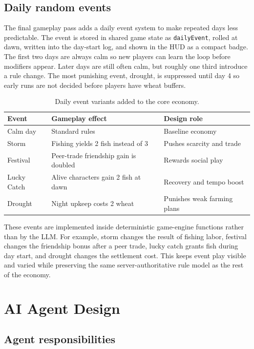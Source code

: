 \documentclass[11pt]{article}
\begin{document}
\subsection{Daily random events}

The final gameplay pass adds a daily event system to make repeated days less
predictable. The event is stored in shared game state as
\texttt{dailyEvent}, rolled at dawn, written into the day-start log, and shown
in the HUD as a compact badge. The first two days are always calm so new players
can learn the loop before modifiers appear. Later days are still often calm, but
roughly one third introduce a rule change. The most punishing event, drought, is
suppressed until day 4 so early runs are not decided before players have wheat
buffers.

\begin{table}[h]
\centering
\begin{tabular}{lll}
\toprule
Event & Gameplay effect & Design role \\
\midrule
Calm day & Standard rules & Baseline economy \\
Storm & Fishing yields 2 fish instead of 3 & Pushes scarcity and trade \\
Festival & Peer-trade friendship gain is doubled & Rewards social play \\
Lucky Catch & Alive characters gain 2 fish at dawn & Recovery and tempo boost \\
Drought & Night upkeep costs 2 wheat & Punishes weak farming plans \\
\bottomrule
\end{tabular}
\caption{Daily event variants added to the core economy.}
\end{table}

These events are implemented inside deterministic game-engine functions rather
than by the LLM. For example, storm changes the result of fishing labor,
festival changes the friendship bonus after a peer trade, lucky catch grants
fish during day start, and drought changes the settlement cost. This keeps event
play visible and varied while preserving the same server-authoritative rule
model as the rest of the economy.

\section{AI Agent Design}

\subsection{Agent responsibilities}
\end{document}
